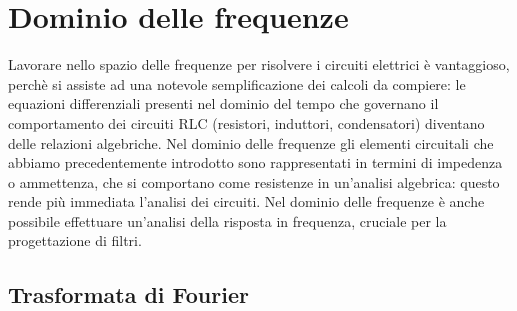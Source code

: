 

\section{Dominio delle frequenze}

Lavorare nello spazio delle frequenze per risolvere i circuiti elettrici è vantaggioso, perchè si assiste ad una notevole
semplificazione dei calcoli da compiere: le equazioni differenziali presenti nel dominio del tempo che governano il comportamento
dei circuiti RLC (resistori, induttori, condensatori) diventano delle relazioni algebriche. Nel dominio delle frequenze gli
elementi circuitali che abbiamo precedentemente introdotto sono rappresentati in termini di impedenza o ammettenza, che si
comportano come resistenze in un'analisi algebrica: questo rende più immediata l'analisi dei circuiti. Nel dominio delle
frequenze è anche possibile effettuare un'analisi della risposta in frequenza, cruciale per la progettazione di filtri.

\subsection{Trasformata di Fourier}

